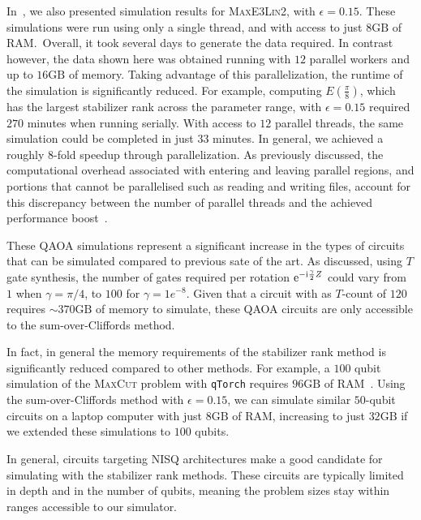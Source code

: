 In~\cite{Bravyi2018}, we also presented simulation results for \textsc{MaxE3Lin2}, with $\epsilon=0.15$. These simulations were run using only a single thread, and with access to just $8\mathrm{GB}$ of RAM.\ Overall, it took several days to generate the data required. In contrast however, the data shown here was obtained running with $12$ parallel workers and up to $16\mathrm{GB}$ of memory. Taking advantage of this parallelization, the runtime of the simulation is significantly reduced. For example, computing $E(\frac{\pi}{8})$, which has the largest stabilizer rank across the parameter range, with $\epsilon=0.15$ required $270$ minutes when running serially. With access to $12$ parallel threads, the same simulation could be completed in just $33$ minutes. In general, we achieved a roughly $8$-fold speedup through parallelization. As previously discussed, the computational overhead associated with entering and leaving parallel regions, and portions that cannot be parallelised such as reading and writing files, account for this discrepancy between the number of parallel threads and the achieved performance boost~\cite{Amdahl1967}.\par
These QAOA simulations represent a significant increase in the types of circuits that can be simulated compared to previous sate of the art. As discussed, using $T$ gate synthesis, the number of gates required per rotation $\mathrm{e}^{-\mathrm{i}\frac{\gamma}{2}Z}$ could vary from $1$ when $\gamma=\pi/4$, to $100$ for $\gamma=1e^{-8}$. Given that a circuit with as $T$-count of $120$ requires $\sim 370\mathrm{GB}$ of memory to simulate, these QAOA circuits are only accessible to the sum-over-Cliffords method.\par
In fact, in general the memory requirements of the stabilizer rank method is significantly reduced compared to other methods. For example, a $100$ qubit simulation of the \textsc{MaxCut} problem with \texttt{qTorch} requires $96\mathrm{GB}$ of RAM~\cite{SchuylerFried2017}. Using the sum-over-Cliffords method with $\epsilon=0.15$, we can simulate similar $50$-qubit circuits on a laptop computer with just $8\mathrm{GB}$ of RAM, increasing to just $32\mathrm{GB}$ if we extended these simulations to $100$ qubits.\par
In general, circuits targeting NISQ architectures make a good candidate for simulating with the stabilizer rank methods. These circuits are typically limited in depth and in the number of qubits, meaning the problem sizes stay within ranges accessible to our simulator.\par
